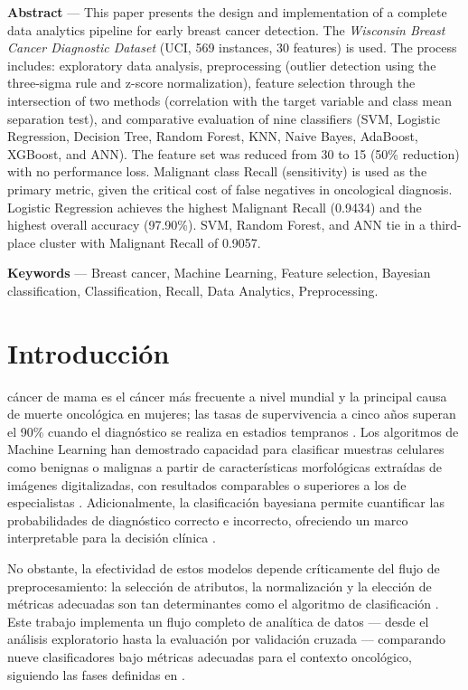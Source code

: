\documentclass[journal]{IEEEtran}
\begin{document}
\smallskip
{}
\noindent\textbf{Abstract} ---
This paper presents the design and implementation of a complete data analytics pipeline for early breast cancer detection. The \textit{Wisconsin Breast Cancer Diagnostic Dataset} (UCI, 569 instances, 30 features) is used. The process includes: exploratory data analysis, preprocessing (outlier detection using the three-sigma rule and z-score normalization), feature selection through the intersection of two methods (correlation with the target variable and class mean separation test), and comparative evaluation of nine classifiers (SVM, Logistic Regression, Decision Tree, Random Forest, KNN, Naive Bayes, AdaBoost, XGBoost, and ANN). The feature set was reduced from 30 to 15 (50\% reduction) with no performance loss. Malignant class Recall (sensitivity) is used as the primary metric, given the critical cost of false negatives in oncological diagnosis. Logistic Regression achieves the highest Malignant Recall (0.9434) and the highest overall accuracy (97.90\%). SVM, Random Forest, and ANN tie in a third-place cluster with Malignant Recall of 0.9057.

\smallskip
\noindent\textbf{Keywords} --- Breast cancer, Machine Learning, Feature selection, Bayesian classification, Classification, Recall, Data Analytics, Preprocessing.

\newpage
\section{Introducción}

 cáncer de mama es el cáncer más frecuente a nivel mundial y la principal causa de muerte oncológica en mujeres; las tasas de supervivencia a cinco años superan el 90\% cuando el diagnóstico se realiza en estadios tempranos \cite{who2023}. Los algoritmos de Machine Learning han demostrado capacidad para clasificar muestras celulares como benignas o malignas a partir de características morfológicas extraídas de imágenes digitalizadas, con resultados comparables o superiores a los de especialistas \cite{kourou2015, asri2016}. Adicionalmente, la clasificación bayesiana permite cuantificar las probabilidades de diagnóstico correcto e incorrecto, ofreciendo un marco interpretable para la decisión clínica \cite{bayesian_med}.

No obstante, la efectividad de estos modelos depende críticamente del flujo de preprocesamiento: la selección de atributos, la normalización y la elección de métricas adecuadas son tan determinantes como el algoritmo de clasificación \cite{remeseiro2019, garcia2015}. Este trabajo implementa un flujo completo de analítica de datos — desde el análisis exploratorio hasta la evaluación por validación cruzada — comparando nueve clasificadores bajo métricas adecuadas para el contexto oncológico, siguiendo las fases definidas en \cite{curso_ud}.
\end{document}
